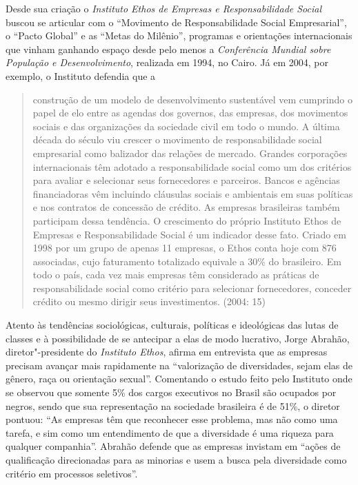 Desde sua criação o \emph{Instituto Ethos de Empresas e Responsabilidade
Social} buscou se articular com o ``Movimento de Responsabilidade Social
Empresarial'', o ``Pacto Global'' e as ``Metas do Milênio'', programas e
orientações internacionais que vinham ganhando espaço desde pelo menos a
\emph{ Conferência Mundial sobre População e Desenvolvimento},
realizada em 1994, no Cairo. Já em 2004, por exemplo, o Instituto
defendia que a

\begin{quote}
construção de um modelo de desenvolvimento sustentável vem cumprindo o
papel de elo entre as agendas dos governos, das empresas, dos movimentos
sociais e das organizações da sociedade civil em todo o mundo. A última
década do século  viu crescer o movimento de responsabilidade social
empresarial como balizador das relações de mercado. Grandes corporações
internacionais têm adotado a responsabilidade social como um dos
critérios para avaliar e selecionar seus fornecedores e parceiros.
Bancos e agências financiadoras vêm incluindo cláusulas sociais e
ambientais em suas políticas e nos contratos de concessão de crédito. As
empresas brasileiras também participam dessa tendência. O crescimento do
próprio Instituto Ethos de Empresas e Responsabilidade Social é um
indicador desse fato. Criado em 1998 por um grupo de apenas 11 empresas,
o Ethos conta hoje com 876 associadas, cujo faturamento totalizado
equivale a 30\% do  brasileiro. Em todo o país, cada vez mais
empresas têm considerado as práticas de responsabilidade social como
critério para selecionar fornecedores, conceder crédito ou mesmo dirigir
seus investimentos. (2004: 15)
\end{quote}

Atento às tendências sociológicas, culturais, políticas e ideológicas
das lutas de classes e à possibilidade de se antecipar a elas de modo
lucrativo, Jorge Abrahão, diretor"-presidente do \emph{Instituto Ethos},
afirma em entrevista que as empresas precisam avançar mais rapidamente
na ``valorização de diversidades, sejam elas de gênero, raça ou
orientação sexual''. Comentando o estudo feito pelo Instituto onde se
observou que somente 5\% dos cargos executivos no Brasil são ocupados
por negros, sendo que sua representação na sociedade brasileira é de
51\%, o diretor pontuou: ``As empresas têm que reconhecer esse problema,
mas não como uma tarefa, e sim como um entendimento de que a diversidade
é uma riqueza para qualquer companhia''. Abrahão defende que as empresas
invistam em ``ações de qualificação direcionadas para as minorias e usem
a busca pela diversidade como critério em processos seletivos''.

